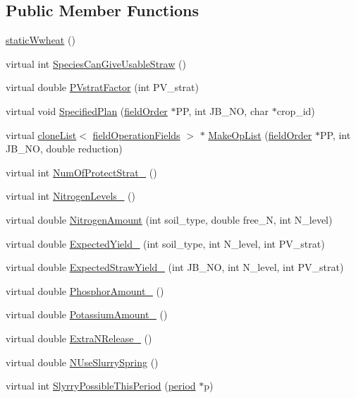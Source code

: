 \subsection*{Public Member Functions}
\begin{DoxyCompactItemize}
\item 
\hyperlink{classstatic_wwheat_a7d9fa03e51dd0478f91de605deea2606}{staticWwheat} ()
\item 
virtual int \hyperlink{classstatic_wwheat_a51961674d4896c3f4c69bec9a4e47ee0}{SpeciesCanGiveUsableStraw} ()
\item 
virtual double \hyperlink{classstatic_wwheat_ab8772fd418b602cc729945fdaebf695e}{PVstratFactor} (int PV\_\-strat)
\item 
virtual void \hyperlink{classstatic_wwheat_adad91fcc0de2a252030e17e25fdc97e4}{SpecifiedPlan} (\hyperlink{classfield_order}{fieldOrder} $\ast$PP, int JB\_\-NO, char $\ast$crop\_\-id)
\item 
virtual \hyperlink{classclone_list}{cloneList}$<$ \hyperlink{classfield_operation_fields}{fieldOperationFields} $>$ $\ast$ \hyperlink{classstatic_wwheat_a7ad6be729608506d81e911675dc9ae1f}{MakeOpList} (\hyperlink{classfield_order}{fieldOrder} $\ast$PP, int JB\_\-NO, double reduction)
\item 
virtual int \hyperlink{classstatic_wwheat_ab3b506b81bbf6bee0b5993a5d1e82e0f}{NumOfProtectStrat\_\-} ()
\item 
virtual int \hyperlink{classstatic_wwheat_ab6756889c263146d276fe9e5f09469ca}{NitrogenLevels\_\-} ()
\item 
virtual double \hyperlink{classstatic_wwheat_a5ef5878549be7108d8fda9ef63b2bc34}{NitrogenAmount} (int soil\_\-type, double free\_\-N, int N\_\-level)
\item 
virtual double \hyperlink{classstatic_wwheat_a2a711b3d2779a34f6b8b95d12e8166fd}{ExpectedYield\_\-} (int soil\_\-type, int N\_\-level, int PV\_\-strat)
\item 
virtual double \hyperlink{classstatic_wwheat_aca3709bba8050b2888a4f1d7f034309d}{ExpectedStrawYield\_\-} (int JB\_\-NO, int N\_\-level, int PV\_\-strat)
\item 
virtual double \hyperlink{classstatic_wwheat_a01fccbd4041ab0eb454ec7df73f3d87c}{PhosphorAmount\_\-} ()
\item 
virtual double \hyperlink{classstatic_wwheat_ac3e69e6aea659a75d0db30841c82ca6d}{PotassiumAmount\_\-} ()
\item 
virtual double \hyperlink{classstatic_wwheat_a96c132fcd9b33934b75c887329d9c09c}{ExtraNRelease\_\-} ()
\item 
virtual double \hyperlink{classstatic_wwheat_a5376e77c08e26a7a57ee1a1ba02095e2}{NUseSlurrySpring} ()
\item 
virtual int \hyperlink{classstatic_wwheat_a9c50241cdc2ca7f9bf8a05813415eb3e}{SlyrryPossibleThisPeriod} (\hyperlink{classperiod}{period} $\ast$p)
\end{DoxyCompactItemize}
